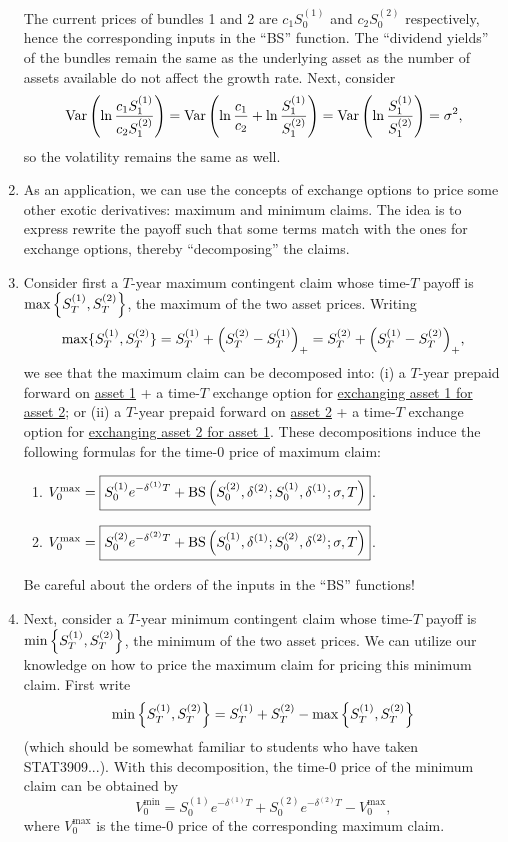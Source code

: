 \begin{enumerate}
\begin{pf}
The current prices of bundles 1 and 2 are \(c_1S_0^{(1)}\) and \(c_2S_0^{(2)}\)
respectively, hence the corresponding inputs in the ``BS'' function. The
``dividend yields'' of the bundles remain the same as the underlying asset as
the number of assets available do not affect the growth rate. Next, consider
\[
\operatorname{Var}\qty(\ln\frac{c_1S_1^{(1)}}{c_2S_1^{(2)}})
=\operatorname{Var}\qty(\ln\frac{c_1}{c_2}+\ln\frac{S_1^{(1)}}{S_1^{(2)}})
=\operatorname{Var}\qty(\ln\frac{S_1^{(1)}}{S_1^{(2)}})
=\sigma^2,
\]
so the volatility remains the same as well.
\end{pf}

\item As an application, we can use the concepts of exchange options to price
some other exotic derivatives: maximum and minimum claims. The idea is to
express rewrite the payoff such that some terms match with the ones for
exchange options, thereby ``decomposing'' the claims.

\item \label{it:max-claim-fmlas} Consider first a \(T\)-year maximum contingent
claim whose time-\(T\) payoff is \(\max\qty{S_T^{(1)},S_T^{(2)}}\), the maximum
of the two asset prices.  Writing
\[
\max\{S_T^{(1)},S_T^{(2)}\}=S_T^{(1)}+\qty(S_T^{(2)}-S_T^{(1)})_{+}
=S_T^{(2)}+\qty(S_T^{(1)}-S_T^{(2)})_{+},
\]
we see that the maximum claim can be decomposed into: (i) a \(T\)-year prepaid
forward on \underline{asset 1} + a time-\(T\) exchange option for
\underline{exchanging asset 1 for asset 2}; or (ii) a \(T\)-year prepaid
forward on \underline{asset 2} + a time-\(T\) exchange option for
\underline{exchanging asset 2 for asset 1}. These decompositions induce the
following formulas for the time-0 price of maximum claim:
\begin{enumerate}[label={(\roman*)}]
\item \(V_0^{\mathrm{max}}=\boxed{S_0^{(1)}e^{-\delta^{(1)}T}+\operatorname{BS}\qty(S_0^{(2)},\delta^{(2)};S_0^{(1)},\delta^{(1)};\sigma,T)}\).
\item \(V_0^{\mathrm{max}}=\boxed{S_0^{(2)}e^{-\delta^{(2)}T}+\operatorname{BS}\qty(S_0^{(1)},\delta^{(1)};S_0^{(2)},\delta^{(2)};\sigma,T)}\).
\end{enumerate}
\begin{warning}
Be careful about the orders of the inputs in the ``BS'' functions!
\end{warning}

\item \label{it:min-max-claim-relate} Next, consider a \(T\)-year minimum
contingent claim whose time-\(T\) payoff is \(\min\qty{S_T^{(1)},S_T^{(2)}}\),
the minimum of the two asset prices. We can utilize our knowledge on how to
price the maximum claim for pricing this minimum claim. First write
\[
\min\qty{S_T^{(1)},S_T^{(2)}}=S_T^{(1)}+S_T^{(2)}-\max\qty{S_T^{(1)},S_T^{(2)}}
\]
(which should be somewhat familiar to students who have taken STAT3909...).
With this decomposition, the time-0 price of the minimum claim can be obtained
by
\[
V_0^{\mathrm{min}}=\boxed{S_0^{(1)}e^{-\delta^{(1)}T}+S_0^{(2)}e^{-\delta^{(2)}T}-V_0^{\mathrm{max}}},
\]
where \(V_0^{\mathrm{max}}\) is the time-0 price of the corresponding maximum
claim.


\end{enumerate}
